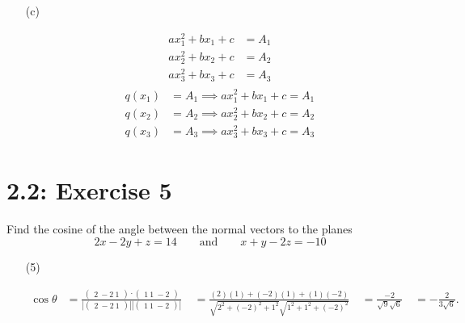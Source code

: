 \documentclass{report}
\begin{document}
\begin{enumerate}
\item[(c)]

\begin{align*}
ax_1^2 + bx_1 + c &= A_1 \\
ax_2^2 + bx_2 + c &= A_2 \\
ax_3^2 + bx_3 + c &= A_3
\end{align*}
\begin{align*}
\boxed{
\begin{array}{ccc}
q(x_1) &= A_1 \implies ax_1^2 + bx_1 + c = A_1 \\
q(x_2) &= A_2 \implies ax_2^2 + bx_2 + c = A_2 \\
q(x_3) &= A_3 \implies ax_3^2 + bx_3 + c = A_3
\end{array}
}
\end{align*}

\end{enumerate}




\section*{2.2: Exercise 5} 

Find the cosine of the angle between the normal vectors to the planes 
\[
2x - 2y + z = 14 \qquad \text{and}\qquad x + y - 2z = -10
\]


\sol 

\begin{enumerate}
\item[(5)]     

\begin{align*}
\cos \theta &= \frac{\begin{pmatrix} 2 \ -2 \ 1 \end{pmatrix} \cdot \begin{pmatrix} 1 \ 1 \ -2 \end{pmatrix}}{\left| \begin{pmatrix} 2 \ -2 \ 1 \end{pmatrix} \right| \left| \begin{pmatrix} 1 \ 1 \ -2 \end{pmatrix} \right|} \
&= \frac{(2)(1) + (-2)(1) + (1)(-2)}{\sqrt{2^2 + (-2)^2 + 1^2} \sqrt{1^2 + 1^2 + (-2)^2}} \
&= \frac{-2}{\sqrt{9} \sqrt{6}} \
&= \boxed{-\frac{2}{3\sqrt{6}}}.
\end{align*}



\end{enumerate}
\end{document}
